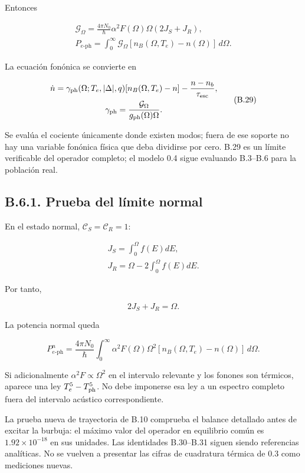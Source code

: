 \documentclass[
  spanish,
  10pt,
  a4paper,
]{article}
\newcounter{none} %
\begin{document}
Entonces

\[
\begin{gathered}
\mathcal G_\Omega=\frac{4\pi N_0}{\hbar}\alpha^2F(\Omega)\Omega(2J_S+J_R),\\
P_{e\text{-ph}}=\int_0^\infty\mathcal G_\Omega
[n_B(\Omega,T_e)-n(\Omega)]\,d\Omega.
\end{gathered} \tag{B.28}
\]

La ecuación fonónica se convierte en

\[
\begin{gathered}
\dot n=\gamma_{\rm ph}(\Omega;T_e,|\Delta|,q)
[n_B(\Omega,T_e)-n]-\frac{n-n_b}{\tau_{\rm esc}},\\
\gamma_{\rm ph}=\frac{\mathcal G_\Omega}{g_{\rm ph}(\Omega)\Omega}.
\end{gathered} \tag{B.29}
\]

Se evalúa el cociente únicamente donde existen modos; fuera de ese
soporte no hay una variable fonónica física que deba dividirse por cero.
B.29 es un límite verificable del operador completo; el modelo 0.4 sigue
evaluando B.3--B.6 para la población real.

\subsection{B.6.1. Prueba del límite
normal}\label{b.6.1.-prueba-del-luxedmite-normal}

En el estado normal, \(\mathcal C_S=\mathcal C_R=1\):

\[
\begin{gathered}
J_S=\int_0^\Omega f(E)dE,\\
J_R=\Omega-2\int_0^\Omega f(E)dE.
\end{gathered}
\]

Por tanto,

\[
2J_S+J_R=\Omega. \tag{B.30}
\]

La potencia normal queda

\[
P_{e\text{-ph}}^{n}=\frac{4\pi N_0}{\hbar}
\int_0^\infty\alpha^2F(\Omega)\Omega^2
[n_B(\Omega,T_e)-n(\Omega)]\,d\Omega. \tag{B.31}
\]

Si adicionalmente \(\alpha^2F\propto\Omega^2\) en el intervalo relevante
y los fonones son térmicos, aparece una ley \(T_e^5-T_{\rm ph}^5\). No
debe imponerse esa ley a un espectro completo fuera del intervalo
acústico correspondiente.

La prueba nueva de trayectoria de B.10 comprueba el balance detallado
antes de excitar la burbuja: el máximo valor del operador en equilibrio
común es \(1.92\times10^{-18}\) en sus unidades. Las identidades
B.30--B.31 siguen siendo referencias analíticas. No se vuelven a
presentar las cifras de cuadratura térmica de 0.3 como mediciones
nuevas.
\end{document}
